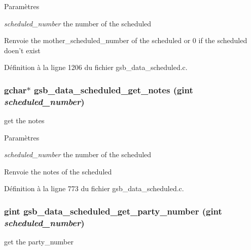 \begin{DoxyParams}{Paramètres}
\item[{\em scheduled\_\-number}]the number of the scheduled\end{DoxyParams}
\begin{DoxyReturn}{Renvoie}
the mother\_\-scheduled\_\-number of the scheduled or 0 if the scheduled doen't exist 
\end{DoxyReturn}


Définition à la ligne 1206 du fichier gsb\_\-data\_\-scheduled.c.

\subsubsection[{gsb\_\-data\_\-scheduled\_\-get\_\-notes}]{\setlength{\rightskip}{0pt plus 5cm}gchar$\ast$ gsb\_\-data\_\-scheduled\_\-get\_\-notes (gint {\em scheduled\_\-number})}\label{gsb__data__scheduled_8c_a77f3e371acac87303d217a472d5ebc3d}
get the notes


\begin{DoxyParams}{Paramètres}
\item[{\em scheduled\_\-number}]the number of the scheduled\end{DoxyParams}
\begin{DoxyReturn}{Renvoie}
the notes of the scheduled 
\end{DoxyReturn}


Définition à la ligne 773 du fichier gsb\_\-data\_\-scheduled.c.

\subsubsection[{gsb\_\-data\_\-scheduled\_\-get\_\-party\_\-number}]{\setlength{\rightskip}{0pt plus 5cm}gint gsb\_\-data\_\-scheduled\_\-get\_\-party\_\-number (gint {\em scheduled\_\-number})}\label{gsb__data__scheduled_8c_a3005278f65b2a095b1ccebdbf7a70f3d}
get the party\_\-number


